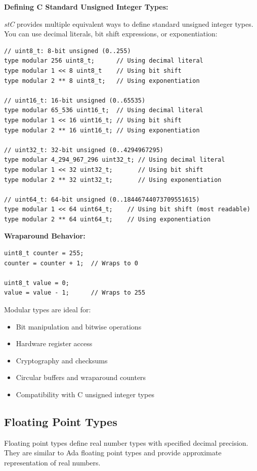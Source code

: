\documentclass[11pt,letterpaper,twoside,openany]{book}
\begin{document}
\textbf{Defining C Standard Unsigned Integer Types:}

\emph{stC} provides multiple equivalent ways to define standard unsigned integer types. You can use decimal literals, bit shift expressions, or exponentiation:

\begin{lstlisting}
// uint8_t: 8-bit unsigned (0..255)
type modular 256 uint8_t;      // Using decimal literal
type modular 1 << 8 uint8_t    // Using bit shift
type modular 2 ** 8 uint8_t;   // Using exponentiation

// uint16_t: 16-bit unsigned (0..65535)
type modular 65_536 uint16_t;  // Using decimal literal
type modular 1 << 16 uint16_t; // Using bit shift
type modular 2 ** 16 uint16_t; // Using exponentiation

// uint32_t: 32-bit unsigned (0..4294967295)
type modular 4_294_967_296 uint32_t; // Using decimal literal
type modular 1 << 32 uint32_t;       // Using bit shift
type modular 2 ** 32 uint32_t;       // Using exponentiation

// uint64_t: 64-bit unsigned (0..18446744073709551615)
type modular 1 << 64 uint64_t;    // Using bit shift (most readable)
type modular 2 ** 64 uint64_t;    // Using exponentiation
\end{lstlisting}

\textbf{Wraparound Behavior:}
\begin{lstlisting}
uint8_t counter = 255;
counter = counter + 1;  // Wraps to 0

uint8_t value = 0;
value = value - 1;      // Wraps to 255
\end{lstlisting}

Modular types are ideal for:
\begin{itemize}
\item Bit manipulation and bitwise operations
\item Hardware register access
\item Cryptography and checksums
\item Circular buffers and wraparound counters
\item Compatibility with C unsigned integer types
\end{itemize}

\subsection{Floating Point Types}

Floating point types define real number types with specified decimal precision. They are similar to Ada floating point types and provide approximate representation of real numbers.
\end{document}
